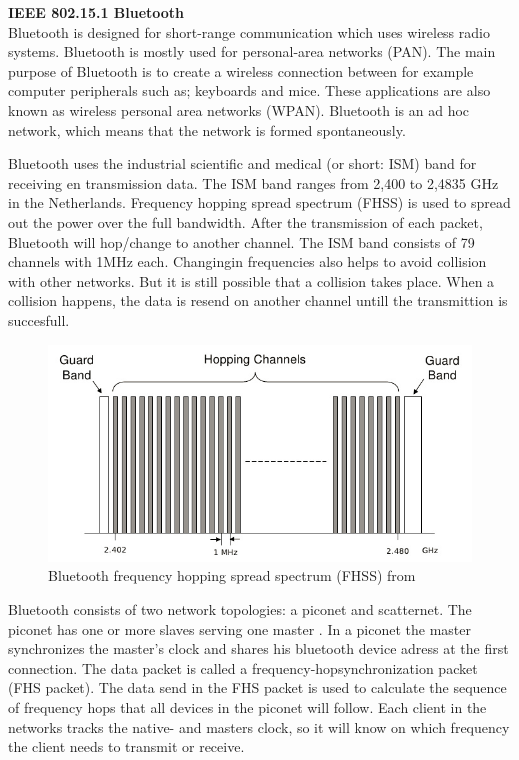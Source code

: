 \documentclass[10pt,a4paper]{article}
\begin{document}
\textbf{\large IEEE 802.15.1 Bluetooth}\\
Bluetooth is designed for short-range communication which uses wireless radio systems. Bluetooth is mostly used for personal-area networks (PAN). \cite{combook} The main purpose of Bluetooth is to create a wireless connection between for example computer peripherals such as; keyboards and mice. These applications are also known as wireless personal area networks (WPAN). \cite{comparitivestudywirelessprotocols} Bluetooth is an ad hoc network, which means that the network is formed spontaneously.\cite{tcipbook}

Bluetooth uses the industrial scientific and medical (or short: ISM) band for receiving en transmission data. The ISM band ranges from 2,400 to 2,4835 GHz in the Netherlands. \cite{frequencyandsnetherlands} Frequency hopping spread spectrum (FHSS) is used to spread out the power over the full bandwidth. After the transmission of each packet, Bluetooth will hop/change to another channel. The ISM band consists of 79 channels with 1MHz each. Changingin frequencies also helps to avoid collision with other networks. But it is still possible that a collision takes place. When a collision happens, the data is resend on another channel untill the transmittion is succesfull.

\begin{figure}[H]
   \centering
   \includegraphics[width=1\textwidth]{bluetoothfh}
   \caption{Bluetooth frequency hopping spread spectrum (FHSS) from \cite{bluetoothspectrum}}
   \label{fig:bluetoothfh}
\end{figure}

Bluetooth consists of two network topologies: a piconet and scatternet. The piconet has one or more slaves serving one master \cite{bluetoothpiconet}. In a piconet the master synchronizes the master's clock and shares his bluetooth device adress at the first connection. The data packet is called a frequency-hopsynchronization packet (FHS packet). The data send in the FHS packet is used to calculate the sequence of frequency hops that all devices in the piconet will follow. Each client in the networks tracks the native- and masters clock, so it will know on which frequency the client needs to transmit or receive.
\end{document}
